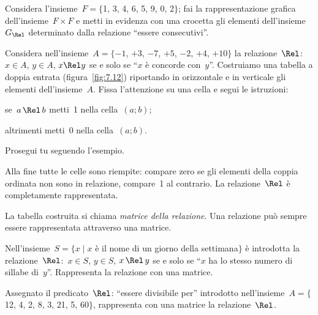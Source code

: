 \begin{esercizio}
\label{ese:\thechapter.8}
Considera l'insieme~$F = \{$1, 3, 4, 6, 5, 9, 0, 2$\}$; fai la rappresentazione grafica dell'insieme~$F \times F$ e metti in evidenza con una crocetta gli
elementi dell'insieme~$G_\Rel$ determinato dalla relazione ``essere consecutivi''.
\end{esercizio}

\begin{esercizio}
\label{ese:\thechapter.9}
Considera nell'insieme~$A = \{-1$, $+3$, $-7$, $+5$, $-2$, $+4$, $+10\}$ la relazione~$\Rel$:~$x \in A$, $y \in A$, $x \Rel y$ se e solo se ``$x$
è concorde con~$y$''. Costruiamo una tabella a doppia entrata (figura~\ref{fig:7.12}) riportando in orizzontale e in verticale gli elementi dell'insieme~$A$.
Fissa l'attenzione su una cella e segui le istruzioni:
\begin{itemize*}
\item se~$a \,\Rel\, b$ metti~1 nella cella~$(a;b)$;
\item altrimenti metti~0 nella cella~$(a;b)$.
\end{itemize*}
Prosegui tu seguendo l'esempio.
\end{esercizio}

\osservazione Alla fine tutte le celle sono riempite: compare zero se gli elementi della coppia ordinata non sono in relazione, compare~1 al contrario.
La relazione~$\Rel$ è completamente rappresentata.

La tabella costruita si chiama \emph{matrice della relazione}.
Una relazione può sempre essere rappresentata attraverso una matrice.

\begin{esercizio}
\label{ese:\thechapter.10}
Nell'insieme~$S = \{ x \mid  x$ è il nome di un giorno della settimana$\}$ è introdotta la relazione~$\Rel$:~$x \in S$, $y \in S$, $x \,\Rel\, y$
se e solo se ``$x$ ha lo stesso numero di sillabe di~$y$''. Rappresenta la relazione con una matrice.
\end{esercizio}

\begin{esercizio}
\label{ese:\thechapter.11}
Assegnato il predicato~$\Rel$: ``essere divisibile per'' introdotto nell'insieme~$A =\{$12, 4, 2, 8, 3, 21, 5, 60$\}$, rappresenta con una matrice la relazione~$\Rel$.
\end{esercizio}

\begin{figure}[b]
\begin{minipage}[b]{.45\textwidth}
 \centering
 
 \caption{}\label{fig:7.12}
\end{minipage}\hfil
\begin{minipage}[b]{.45\textwidth}
 \centering
 
 \caption{}\label{fig:7.13}
\end{minipage}
\end{figure}

